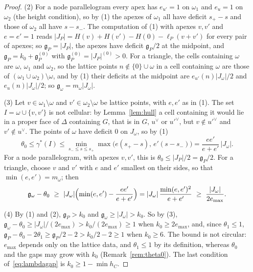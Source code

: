\begin{proof}
(2) For a node parallelogram every apex has $e_{u'}=1$ on $\omega_1$ and $e_u=1$ on $\omega_2$ (the height condition),
so by (1) the apexes of $\omega_1$ all have deficit $s_+-s$ and those of $\omega_2$ all have $s-s_-$. The computation of
(1) with apexes $v,v'$ and $e=e'=1$ reads $|J_P|=H(v)+H(v')-H(0)-\ell_P(v+v')$ for every pair of apexes; so
$\mathfrak g_P=|J_P|$, the apexes have deficit $\mathfrak g_P/2$ at the midpoint, and $\mathfrak g_P=k_0+\mathfrak g_P^{(0)}$
with $\mathfrak g^{(0)}_P=|J_P|^{(0)}>0$. For a triangle, the cells containing $\omega$ are $\omega$, $\omega_1$ and $\omega_2$,
so the lattice points $n\notin\{0\}\cup\omega$ in a cell containing $\omega$ are those of $(\omega_1\cup\omega_2)\setminus\omega$,
and by (1) their deficits at the midpoint are $e_{u'}(n)|J_\omega|/2$ and $e_u(n)|J_\omega|/2$; so
$\mathfrak g_\omega=m_\omega|J_\omega|$.

(3) Let $v\in\omega_1\setminus\omega$ and $v'\in\omega_2\setminus\omega$ be lattice points, with $e,e'$ as in (1). The set
$I=\omega\cup\{v,v'\}$ is not cellular: by Lemma~\ref{lem:hull} a cell containing it would lie in a proper face of $\Delta$
containing $G$, that is in $G$, $u^\vee$ or $u'^\vee$, but $v\notin u'^\vee$ and $v'\notin u^\vee$. The points of $\omega$
have deficit $0$ on $J_\omega$, so by (1)
\[
\theta_0\le\gamma^*(I)\le\min_{s_-\le s\le s_+}\max\bigl(e(s_+-s),\,e'(s-s_-)\bigr)=\frac{ee'}{e+e'}\,|J_\omega| .
\]
For a node parallelogram, with apexes $v,v'$, this is $\theta_0\le|J_P|/2=\mathfrak g_P/2$. For a triangle, choose $v$
and $v'$ with $e$ and $e'$ smallest on their sides, so that $\min(e,e')=m_\omega$; then
\[
\mathfrak g_\omega-\theta_0\ \ge\ |J_\omega|\Bigl(\min(e,e')-\frac{ee'}{e+e'}\Bigr)=|J_\omega|\,\frac{\min(e,e')^2}{e+e'}\ \ge\
\frac{|J_\omega|}{2e_{\max}} .
\]

(4) By (1) and (2), $\mathfrak g_P>k_0$ and $\mathfrak g_\omega\ge|J_\omega|>k_0$. So by (3),
$\mathfrak g_\omega-\theta_0\ge|J_\omega|/(2e_{\max})>k_0/(2e_{\max})\ge1$ when $k_0\ge2e_{\max}$, and, since $\theta_1\le1$,
$\mathfrak g_P-\theta_0-2\theta_1\ge\mathfrak g_P/2-2>k_0/2-2\ge1$ when $k_0\ge6$. The bound is not circular: $e_{\max}$
depends only on the lattice data, and $\theta_1\le1$ by its definition, whereas $\theta_0$ and the gaps may grow
with $k_0$ (Remark~\ref{rem:theta0}). The last condition of~\eqref{eq:lambdagap} is $k_0\ge1-\min h_C$.
\end{proof}

